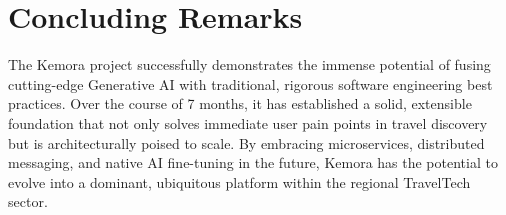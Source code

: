 \section{Concluding Remarks}
The Kemora project successfully demonstrates the immense potential of fusing cutting-edge Generative AI with traditional, rigorous software engineering best practices. Over the course of 7 months, it has established a solid, extensible foundation that not only solves immediate user pain points in travel discovery but is architecturally poised to scale. By embracing microservices, distributed messaging, and native AI fine-tuning in the future, Kemora has the potential to evolve into a dominant, ubiquitous platform within the regional TravelTech sector.
